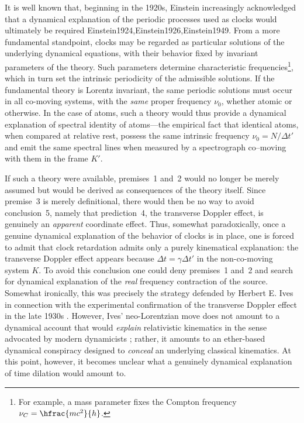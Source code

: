 \documentclass[pdflatex,sn-basic]{sn-jnl}
\newcommand{\tDe}{transverse Doppler effect\xspace}
\begin{document}
It is well known that, beginning in the 1920s, Einstein increasingly acknowledged that a dynamical explanation of the periodic processes used as clocks would ultimately be required \citep{Einstein1921,Einstein1923}{Einstein1924,Einstein1926,Einstein1949}. From a more fundamental standpoint, clocks may be regarded as particular solutions of the underlying dynamical equations, with their behavior fixed by invariant parameters of the theory. Such parameters determine characteristic frequencies\footnote{For example, a mass parameter fixes the Compton frequency $\nu_C=\hfrac{mc^2}{h}$.}, which in turn set the intrinsic periodicity of the admissible solutions. If the fundamental theory is Lorentz invariant, the same periodic solutions must occur in all co-moving systems, with the \emph{same} proper frequency $\nu_0$, whether atomic or otherwise. In the case of atoms, such a theory would thus provide a dynamical explanation of spectral identity of atoms---the empirical fact that identical atoms, when compared at relative rest, possess the same intrinsic frequency $\nu_0 = N/\Delta t'$ and emit the same spectral lines when measured by a spectrograph co--moving with them in the frame $K'$.

If such a theory were available, premises~1 and~2 would no longer be merely assumed but would be derived as consequences of the theory itself. Since premise~3 is merely definitional, there would then be no way to avoid conclusion~5, namely that prediction~4, the \tDe, is genuinely an \emph{apparent} coordinate effect. Thus, somewhat paradoxically, once a genuine dynamical explanation of the behavior of clocks is in place, one is forced to admit that clock retardation admits only a purely kinematical explanation: the \tDe appears because $\Delta t = \gamma \Delta t'$ in the non-co-moving system $K$. To avoid this conclusion one could deny premises~1 and~2 and search for dynamical explanation of the \emph{real} frequency contraction of the source. Somewhat ironically, this was precisely the strategy defended by Herbert E. Ives \citep{Ives1938} in connection with the experimental confirmation of the \tDe in the late 1930s \citep{Lalli2013}. However, Ives’ neo-Lorentzian move does not amount to a dynamical account that would \emph{explain} relativistic kinematics in the sense advocated by modern dynamicists \citep[vii]{Brown2005}; rather, it amounts to an ether-based dynamical conspiracy designed to \emph{conceal} an underlying classical kinematics. At this point, however, it becomes unclear what a genuinely dynamical explanation of time dilation would amount to.
\end{document}
